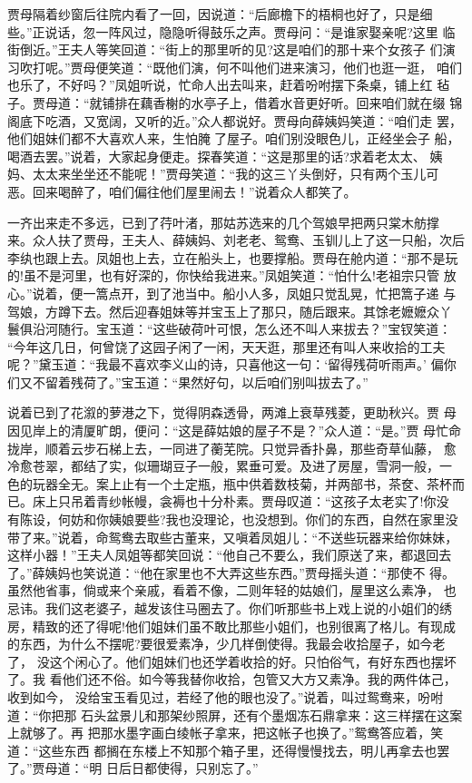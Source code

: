 贾母隔着纱窗后往院内看了一回，因说道：“后廊檐下的梧桐也好了，只是细
些。”正说话，忽一阵风过，隐隐听得鼓乐之声。贾母问：“是谁家娶亲呢?这里
临街倒近。”王夫人等笑回道：“街上的那里听的见?这是咱们的那十来个女孩子
们演习吹打呢。”贾母便笑道：“既他们演，何不叫他们进来演习，他们也逛一逛，
咱们也乐了，不好吗？”凤姐听说，忙命人出去叫来，赶着吩咐摆下条桌，铺上红
毡子。贾母道：“就铺排在藕香榭的水亭子上，借着水音更好听。回来咱们就在缀
锦阁底下吃酒，又宽阔，又听的近。”众人都说好。贾母向薛姨妈笑道：“咱们走
罢，他们姐妹们都不大喜欢人来，生怕腌了屋子。咱们别没眼色儿，正经坐会子
船，喝酒去罢。”说着，大家起身便走。探春笑道：“这是那里的话?求着老太太、
姨妈、太太来坐坐还不能呢！”贾母笑道：“我的这三丫头倒好，只有两个玉儿可
恶。回来喝醉了，咱们偏往他们屋里闹去！”说着众人都笑了。

一齐出来走不多远，已到了荇叶渚，那姑苏选来的几个驾娘早把两只棠木舫撑
来。众人扶了贾母，王夫人、薛姨妈、刘老老、鸳鸯、玉钏儿上了这一只船，次后
李纨也跟上去。凤姐也上去，立在船头上，也要撑船。贾母在舱内道：“那不是玩
的!虽不是河里，也有好深的，你快给我进来。”凤姐笑道：“怕什么!老祖宗只管
放心。”说着，便一篙点开，到了池当中。船小人多，凤姐只觉乱晃，忙把篙子递
与驾娘，方蹲下去。然后迎春姐妹等并宝玉上了那只，随后跟来。其馀老嬷嬷众丫
鬟俱沿河随行。宝玉道：“这些破荷叶可恨，怎么还不叫人来拔去？”宝钗笑道：
“今年这几日，何曾饶了这园子闲了一闲，天天逛，那里还有叫人来收拾的工夫
呢？”黛玉道：“我最不喜欢李义山的诗，只喜他这一句：‘留得残荷听雨声。’
偏你们又不留着残荷了。”宝玉道：“果然好句，以后咱们别叫拔去了。”

说着已到了花溆的萝港之下，觉得阴森透骨，两滩上衰草残菱，更助秋兴。贾
母因见岸上的清厦旷朗，便问：“这是薛姑娘的屋子不是？”众人道：“是。”贾
母忙命拢岸，顺着云步石梯上去，一同进了蘅芜院。只觉异香扑鼻，那些奇草仙藤，
愈冷愈苍翠，都结了实，似珊瑚豆子一般，累垂可爱。及进了房屋，雪洞一般，一
色的玩器全无。案上止有一个土定瓶，瓶中供着数枝菊，并两部书，茶奁、茶杯而
已。床上只吊着青纱帐幔，衾褥也十分朴素。贾母叹道：“这孩子太老实了!你没
有陈设，何妨和你姨娘要些?我也没理论，也没想到。你们的东西，自然在家里没
带了来。”说着，命鸳鸯去取些古董来，又嗔着凤姐儿：“不送些玩器来给你妹妹，
这样小器！”王夫人凤姐等都笑回说：“他自己不要么，我们原送了来，都退回去
了。”薛姨妈也笑说道：“他在家里也不大弄这些东西。”贾母摇头道：“那使不
得。虽然他省事，倘或来个亲戚，看着不像，二则年轻的姑娘们，屋里这么素净，
也忌讳。我们这老婆子，越发该住马圈去了。你们听那些书上戏上说的小姐们的绣
房，精致的还了得呢!他们姐妹们虽不敢比那些小姐们，也别很离了格儿。有现成
的东西，为什么不摆呢?要很爱素净，少几样倒使得。我最会收拾屋子，如今老了，
没这个闲心了。他们姐妹们也还学着收拾的好。只怕俗气，有好东西也摆坏了。我
看他们还不俗。如今等我替你收拾，包管又大方又素净。我的两件体己，收到如今，
没给宝玉看见过，若经了他的眼也没了。”说着，叫过鸳鸯来，吩咐道：“你把那
石头盆景儿和那架纱照屏，还有个墨烟冻石鼎拿来：这三样摆在这案上就够了。再
把那水墨字画白绫帐子拿来，把这帐子也换了。”鸳鸯答应着，笑道：“这些东西
都搁在东楼上不知那个箱子里，还得慢慢找去，明儿再拿去也罢了。”贾母道：“明
日后日都使得，只别忘了。”

